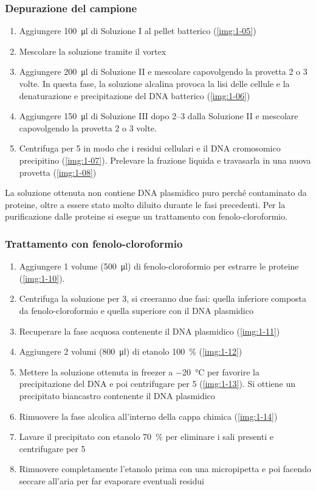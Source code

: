 \subsubsection{Depurazione del campione}
\begin{enumerate}
	\item Aggiungere \qty{100}{\micro\litre} di Soluzione I al pellet batterico (\autoref{img:1-05})
	\item Mescolare la soluzione tramite il \foreignlanguage{english}{vortex}
	\item Aggiungere \qty{200}{\micro\litre} di Soluzione II e mescolare capovolgendo la provetta 2 o 3 volte. In questa fase, la soluzione alcalina provoca la lisi delle cellule e la denaturazione e precipitazione del DNA batterico (\autoref{img:1-06})    
	\item Aggiungere \qty{150}{\micro\litre} di Soluzione III dopo \qtyrange{2}{3}{\min} dalla Soluzione II e mescolare capovolgendo la provetta 2 o 3 volte.    
	\item Centrifuga per \qty{5}{\min} in modo che i residui cellulari e il DNA cromosomico precipitino (\autoref{img:1-07}). Prelevare la frazione liquida e travasarla in una nuova provetta (\autoref{img:1-08})
\end{enumerate}
La soluzione ottenuta non contiene DNA plasmidico puro perché contaminato da proteine, oltre a essere stato molto diluito durante le fasi precedenti. Per la purificazione dalle proteine si esegue un trattamento con fenolo-cloroformio.
\subsubsection{Trattamento con fenolo-cloroformio}
\begin{enumerate}
	\item Aggiungere 1 volume (\qty{500}{\micro\litre}) di fenolo-cloroformio per estrarre le proteine (\autoref{img:1-10}).  
	\item  Centrifuga la soluzione per \qty{3}{\min}, si creeranno due fasi: quella inferiore composta da fenolo-cloroformio e quella superiore con il DNA plasmidico
	\item Recuperare la fase acquosa contenente il DNA plasmidico (\autoref{img:1-11})
	\item Aggiungere 2 volumi (\qty{800}{\micro\litre}) di etanolo \qty{100}{\percent} (\autoref{img:1-12})
	\item Mettere la soluzione ottenuta in freezer a \qty{-20}{\celsius} per favorire la precipitazione del DNA e poi centrifugare per \qty{5}{\min} (\autoref{img:1-13}). Si ottiene un precipitato biancastro contenente il DNA plasmidico
	\item Rimuovere la fase alcolica all’interno della cappa chimica (\autoref{img:1-14})
	\item Lavare il precipitato con etanolo \qty{70}{\percent} per eliminare i sali presenti e centrifugare per \qty{5}{\min}
	\item Rimuovere completamente l’etanolo prima con una micropipetta e poi facendo seccare all’aria per far evaporare eventuali residui
\end{enumerate}

